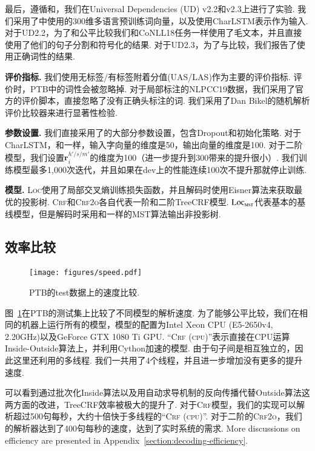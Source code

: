 最后，遵循\cite{ji-etal-2019-graph}和\cite{zhang-etal-2019-empirical}，我们在Universal Dependencies (UD) v2.2和v2.3上进行了实验.
我们采用了\cite{zeman-etal-2018-conll}中使用的300维多语言预训练词向量，以及使用CharLSTM表示作为输入.
对于UD2.2，为了和\cite{ji-etal-2019-graph}公平比较我们和CoNLL18任务一样\cite{zeman-etal-2018-conll}使用了毛文本，并且直接使用了他们的句子分割和符号化的结果.
对于UD2.3，为了与\cite{zhang-etal-2019-empirical}比较，我们报告了使用正确词性的结果.

\noindent\textbf{评价指标.}
我们使用无标签/有标签附着分值(UAS/LAS)作为主要的评价指标.
评价时，PTB中的词性会被忽略掉.
对于局部标注的NLPCC19数据，我们采用了官方的评价脚本，直接忽略了没有正确头标注的词.
我们采用了Dan Bikel的随机解析评价比较器来进行显著性检验.

\noindent\textbf{参数设置.}
我们直接采用了\cite{Timothy-d17-biaffine}的大部分参数设置，包含Dropout和初始化策略.
对于CharLSTM，和\cite{lample-etal-2016-neural}一样，输入字向量的维度是50，输出向量的维度是100.
对于二阶模型，我们设置$\mathbf{r}^{h'/s/m'}_i$的维度为100（进一步提升到300带来的提升很小）.
我们训练模型最多1,000次迭代，并且如果在dev上的性能连续100次不提升那就停止训练.

\noindent\textbf{模型.}
\textsc{Loc}使用了局部交叉熵训练损失函数，并且解码时使用Eisner算法来获取最优的投影树.
\textsc{Crf}和\textsc{Crf2o}各自代表一阶和二阶TreeCRF模型.
$\textsc{Loc}_{\textsc{mst}}$代表基本的基线模型，但是解码时采用和\cite{Timothy-d17-biaffine}一样的MST算法输出非投影树.

\subsection{效率比较}

\begin{figure}[tb]
    \centering
    \texttt{[image: figures/speed.pdf]}
    \caption{
        PTB的test数据上的速度比较.
    }
    \label{fig:speed}
\end{figure}

图~\ref{fig:speed}在PTB的测试集上比较了不同模型的解析速度.
为了能够公平比较，我们在相同的机器上运行所有的模型，模型的配置为Intel Xeon CPU (E5-2650v4, 2.20GHz)以及GeForce GTX 1080 Ti GPU.
``\textsc{Crf (cpu)}''表示直接在CPU运算Inside-Outside算法上，并利用Cython加速的模型.
由于句子间是相互独立的，因此这里还利用的多线程.
我们一共用了4个线程，并且进一步增加没有更多的提升速度.

可以看到通过批次化Inside算法以及用自动求导机制的反向传播代替Outside算法这两方面的改进，TreeCRF效率被极大的提升了.
对于\textsc{Crf}模型，我们的实现可以解析超过500句每秒，大约十倍快于多线程的``\textsc{Crf (cpu)}''.
对于二阶的\textsc{Crf2o}，我们的解析器达到了400句每秒的速度，达到了实时系统的需求.
More discussions on efficiency are presented in Appendix~\ref{section:decoding-efficiency}.

